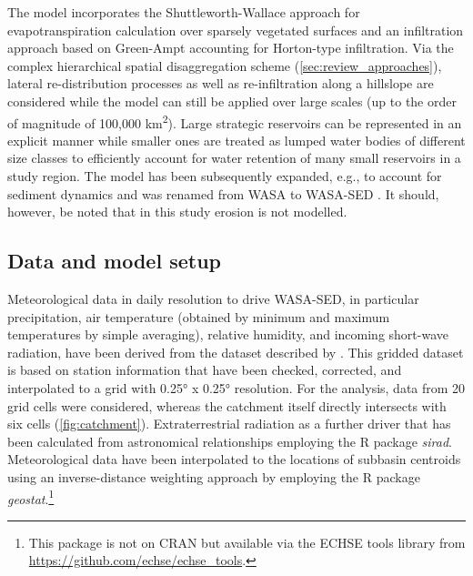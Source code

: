 The model incorporates the Shuttleworth-Wallace approach for evapotranspiration calculation over sparsely vegetated surfaces and an infiltration approach based on Green-Ampt accounting for Horton-type infiltration.
Via the complex hierarchical spatial disaggregation scheme (\DIFdelbegin {}\DIFdelend \DIFaddbegin {}\DIFaddend \ref{sec:review_approaches}), lateral re-distribution processes as well as re-infiltration along a hillslope are considered while the model can still be applied over large scales (up to the order of magnitude of 100,000 \unit{km^2}).
Large strategic reservoirs can be represented in an explicit manner while smaller ones are treated as lumped water bodies of different size classes to efficiently account for water retention of many small reservoirs in a study region.
The model has been subsequently expanded, e.g., to account for sediment dynamics and was renamed from WASA to WASA-SED \citep{Mueller2010}.
It should, however, be noted that in this study erosion is not modelled.


\subsection{Data and model setup}
\label{sec:data}
Meteorological data in daily resolution to drive WASA-SED, in particular precipitation, air temperature (obtained by minimum and maximum temperatures by simple averaging), relative humidity, and incoming short-wave radiation, have been derived from the dataset described by \citet{Xavier2016}.
This gridded dataset is based on station information that have been checked, corrected, and interpolated to a grid with 0.25\unit{\degree} x 0.25\unit{\degree} resolution.
For the analysis, data from 20 grid cells were considered, whereas the catchment itself directly intersects with six cells (\DIFdelbegin {}\DIFdelend \DIFaddbegin {}\DIFaddend \ref{fig:catchment}).
Extraterrestrial radiation as a further driver that has been calculated from astronomical relationships employing the R package \emph{sirad}.
Meteorological data have been interpolated to the locations of subbasin centroids using an inverse-distance weighting approach by employing the R package \emph{geostat}.\footnote{This package is not on CRAN but available via the ECHSE tools library from \url{https://github.com/echse/echse_tools}.}

